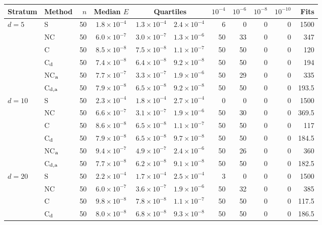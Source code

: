 \begin{tabular}{@{}llr ccc rrrr r@{}}
\toprule
Stratum & Method & $n$ & Median $E$ & \multicolumn{2}{c}{Quartiles} & $10^{-4}$ & $10^{-6}$ & $10^{-8}$ & $10^{-10}$ & Fits\\
\midrule
$d=5$ & S & 50 & $1.8\times10^{-4}$ & $1.3\times10^{-4}$ & $2.4\times10^{-4}$ & 6 & 0 & 0 & 0 & 1500\\
 & NC & 50 & $6.0\times10^{-7}$ & $3.0\times10^{-7}$ & $1.3\times10^{-6}$ & 50 & 33 & 0 & 0 & 347\\
 & C & 50 & $8.5\times10^{-8}$ & $7.5\times10^{-8}$ & $1.1\times10^{-7}$ & 50 & 50 & 0 & 0 & 120\\
 & C$_{\rm d}$ & 50 & $7.4\times10^{-8}$ & $6.4\times10^{-8}$ & $9.2\times10^{-8}$ & 50 & 50 & 0 & 0 & 194\\
 & NC$_{\rm a}$ & 50 & $7.7\times10^{-7}$ & $3.3\times10^{-7}$ & $1.9\times10^{-6}$ & 50 & 29 & 0 & 0 & 335\\
 & C$_{\rm d,a}$ & 50 & $7.9\times10^{-8}$ & $6.5\times10^{-8}$ & $9.2\times10^{-8}$ & 50 & 50 & 0 & 0 & 193.5\\
\midrule
$d=10$ & S & 50 & $2.3\times10^{-4}$ & $1.8\times10^{-4}$ & $2.7\times10^{-4}$ & 0 & 0 & 0 & 0 & 1500\\
 & NC & 50 & $6.6\times10^{-7}$ & $3.1\times10^{-7}$ & $1.9\times10^{-6}$ & 50 & 30 & 0 & 0 & 369.5\\
 & C & 50 & $8.6\times10^{-8}$ & $6.5\times10^{-8}$ & $1.1\times10^{-7}$ & 50 & 50 & 0 & 0 & 117\\
 & C$_{\rm d}$ & 50 & $7.9\times10^{-8}$ & $6.5\times10^{-8}$ & $9.7\times10^{-8}$ & 50 & 50 & 0 & 0 & 184.5\\
 & NC$_{\rm a}$ & 50 & $9.4\times10^{-7}$ & $4.9\times10^{-7}$ & $2.4\times10^{-6}$ & 50 & 26 & 0 & 0 & 360\\
 & C$_{\rm d,a}$ & 50 & $7.7\times10^{-8}$ & $6.2\times10^{-8}$ & $9.1\times10^{-8}$ & 50 & 50 & 0 & 0 & 182.5\\
\midrule
$d=20$ & S & 50 & $2.2\times10^{-4}$ & $1.7\times10^{-4}$ & $2.5\times10^{-4}$ & 3 & 0 & 0 & 0 & 1500\\
 & NC & 50 & $6.0\times10^{-7}$ & $3.6\times10^{-7}$ & $1.9\times10^{-6}$ & 50 & 32 & 0 & 0 & 385\\
 & C & 50 & $9.8\times10^{-8}$ & $7.8\times10^{-8}$ & $1.1\times10^{-7}$ & 50 & 50 & 0 & 0 & 117.5\\
 & C$_{\rm d}$ & 50 & $8.0\times10^{-8}$ & $6.8\times10^{-8}$ & $9.3\times10^{-8}$ & 50 & 50 & 0 & 0 & 186.5\\

\end{tabular}
